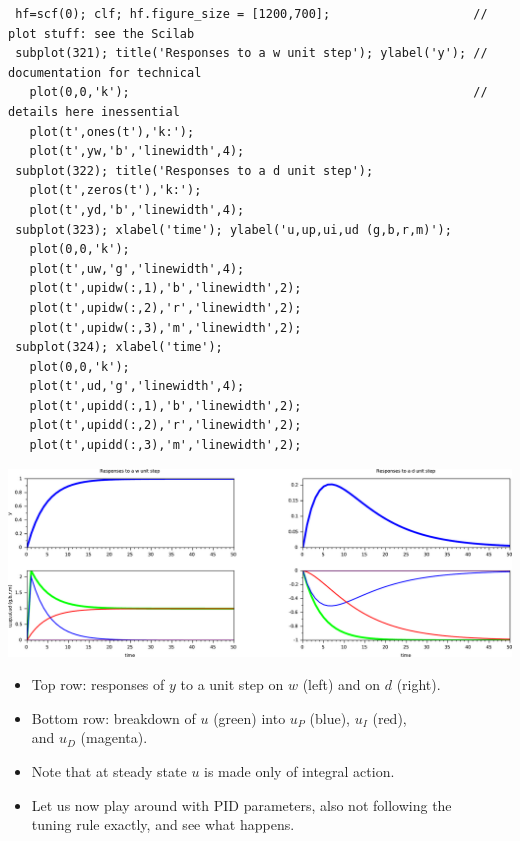 \begin{frame}[fragile]
\myPause
 {\scriptsize
 \begin{verbatim}
 hf=scf(0); clf; hf.figure_size = [1200,700];                    // plot stuff: see the Scilab
 subplot(321); title('Responses to a w unit step'); ylabel('y'); // documentation for technical
   plot(0,0,'k');                                                // details here inessential
   plot(t',ones(t'),'k:');
   plot(t',yw,'b','linewidth',4);
 subplot(322); title('Responses to a d unit step'); 
   plot(t',zeros(t'),'k:');
   plot(t',yd,'b','linewidth',4);
 subplot(323); xlabel('time'); ylabel('u,up,ui,ud (g,b,r,m)');
   plot(0,0,'k');
   plot(t',uw,'g','linewidth',4);
   plot(t',upidw(:,1),'b','linewidth',2);
   plot(t',upidw(:,2),'r','linewidth',2);
   plot(t',upidw(:,3),'m','linewidth',2);
 subplot(324); xlabel('time');
   plot(0,0,'k');
   plot(t',ud,'g','linewidth',4);
   plot(t',upidd(:,1),'b','linewidth',2);
   plot(t',upidd(:,2),'r','linewidth',2);
   plot(t',upidd(:,3),'m','linewidth',2);
 \end{verbatim}
 }
\end{frame}

\begin{frame}
\myPause
 \begin{center}
  \includegraphics[width=0.75\columnwidth]{./Unit-07/img/PIDactions-scilab-01.pdf}
 \end{center}
 \begin{itemize}[<+-| alert@+>]
 \item Top row: responses of $y$ to a unit step on $w$ (left) and on $d$ (right).
 \item Bottom row: breakdown of $u$ (green) into $u_P$ (blue), $u_I$ (red),\\
       and $u_D$ (magenta).
 \item Note that at steady state $u$ is made only of integral action.
 \item Let us now play around with PID parameters, also not following the\\
       tuning rule exactly, and see what happens.
 \end{itemize}
\end{frame}

